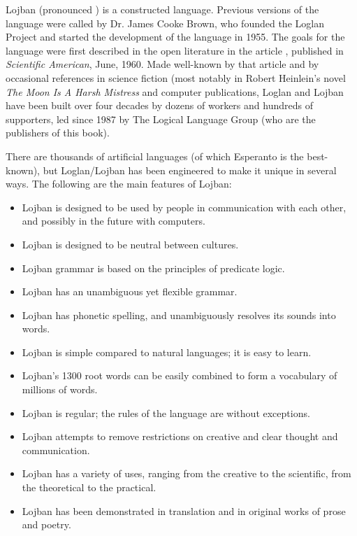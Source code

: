 Lojban (pronounced ) is a constructed language. Previous versions of the language were called  by Dr. James Cooke Brown, who founded the Loglan Project and started the development of the language in 1955. The goals for the language were first described in the open literature in the article , published in \textit{Scientific American}, June, 1960. Made well-known by that article and by occasional references in science fiction (most notably in Robert Heinlein's novel \textit{The Moon Is A Harsh Mistress} and computer publications, Loglan and Lojban have been built over four decades by dozens of workers and hundreds of supporters, led since 1987 by The Logical Language Group (who are the publishers of this book).

There are thousands of artificial languages (of which Esperanto is the best-known), but Loglan/Lojban has been engineered to make it unique in several ways. The following are the main features of Lojban:

\begin{itemize}
\item Lojban is designed to be used by people in communication with each other, and possibly in the future with computers.
\item Lojban is designed to be neutral between cultures.
\item Lojban grammar is based on the principles of predicate logic.
\item Lojban has an unambiguous yet flexible grammar.
\item Lojban has phonetic spelling, and unambiguously resolves its sounds into words.
\item Lojban is simple compared to natural languages; it is easy to learn.
\item Lojban's 1300 root words can be easily combined to form a vocabulary of millions of words.
\item Lojban is regular; the rules of the language are without exceptions.
\item Lojban attempts to remove restrictions on creative and clear thought and communication.
\item Lojban has a variety of uses, ranging from the creative to the scientific, from the theoretical to the practical.
\item Lojban has been demonstrated in translation and in original works of prose and poetry.
\end{itemize}



